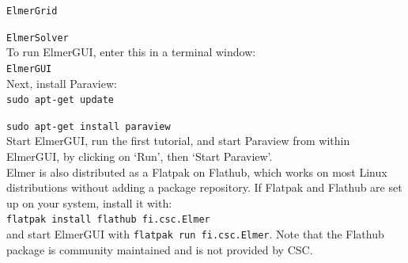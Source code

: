 \texttt{ElmerGrid}

\texttt{ElmerSolver}\\

To run ElmerGUI, enter this in a terminal window:\\

\texttt{ElmerGUI}\\

Next, install Paraview:\\

\texttt{sudo apt-get update}

\texttt{sudo apt-get install paraview}\\

Start ElmerGUI, run the first tutorial, and start Paraview from within ElmerGUI, by clicking on `Run', then `Start Paraview'.\\

Elmer is also distributed as a Flatpak on Flathub, which works on most Linux distributions without adding a package repository.  If Flatpak and Flathub are set up on your system, install it with: \\

\texttt{flatpak install flathub fi.csc.Elmer}\\

and start ElmerGUI with \texttt{flatpak run fi.csc.Elmer}.  Note that the Flathub package is community maintained and is not provided by CSC.











